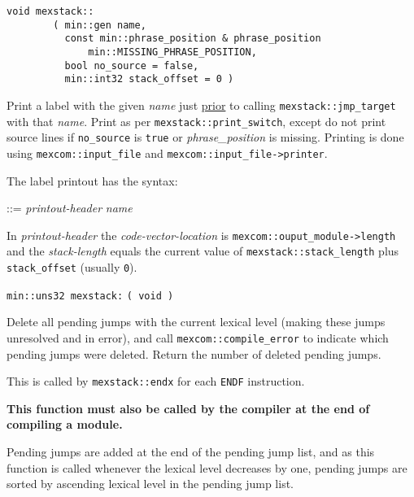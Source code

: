 \documentclass[12pt]{article}
\begin{document}
\verb|void mexstack::| \label{PRINT-LABEL} \\
\verb|        ( min::gen name,| \\
\verb|          const min::phrase_position & phrase_position| \\
\verb|              min::MISSING_PHRASE_POSITION,| \\
\verb|          bool no_source = false,| \\
\verb|          min::int32 stack_offset = 0 )|
\begin{indpar}
Print a label with the given {\em name} just \underline{prior} to calling
{\tt mexstack::jmp\_target} with that {\em name}.
Print as per {\tt mexstack::\EOL print\_\EOL switch},
except do not print source lines if
{\tt no\_source} is {\tt true} or {\em phrase\_position} is missing.
Printing is done using {\tt mexcom::\EOL input\_\EOL file} and
{\tt mexcom::\EOL input\_\EOL file->\EOL printer}.

The label printout has the syntax:
\begin{indpar}
 ::=
    {\em printout-header}  {\em name}
\end{indpar}
In {\em printout-header}
the {\em code-vector-location} is
{\tt mexcom::ouput\_module->length} and
the {\em stack-length} equals the current value of
{\tt mexstack::stack\_length}
plus {\tt stack\_\EOL offset} (usually {\tt 0}).
\end{indpar}

\verb|min::uns32 mexstack:|  \verb|( void )|
\begin{indpar}
Delete all pending jumps with the current lexical level (making these
jumps unresolved and in error), and
call {\tt mexcom::compile\_error} to indicate which pending jumps
were deleted.  Return the number of deleted pending jumps.

This is called by {\tt mexstack::endx} for each {\tt ENDF} instruction.

{\bf This function must also be called by the compiler
at the end of compiling a module.}

Pending jumps are added at the end of the pending jump list, and
as this function is called whenever the lexical level decreases by one,
pending jumps are sorted by ascending lexical level in the pending jump list.
\end{indpar}
\end{document}
